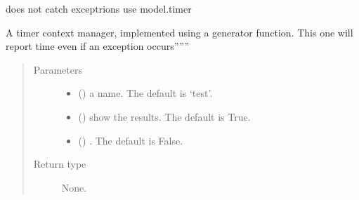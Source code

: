 \documentclass[letterpaper,10pt,english]{sphinxmanual}
\begin{document}

\begin{fulllineitems}
\label{\detokenize{index:modelclass.timer_old}}
\pysigstartsignatures
{}
\pysigstopsignatures
\sphinxAtStartPar
does not catch exceptrions use model.timer

\sphinxAtStartPar
A timer context manager, implemented using a
generator function. This one will report time even if an exception occurs”””
\begin{quote}\begin{description}
\item[{Parameters}] \leavevmode\begin{itemize}
\item {} 
\sphinxAtStartPar
{} (\sphinxstyleliteralemphasis{\sphinxupquote{, }}) \textendash{} a name. The default is ‘test’.

\item {} 
\sphinxAtStartPar
{} (\sphinxstyleliteralemphasis{\sphinxupquote{, }}) \textendash{} show the results. The default is True.

\item {} 
\sphinxAtStartPar
{} (\sphinxstyleliteralemphasis{\sphinxupquote{, }}) \textendash{} . The default is False.

\end{itemize}

\item[{Return type}] \leavevmode
\sphinxAtStartPar
None.

\end{description}\end{quote}

\end{fulllineitems}
\end{document}
